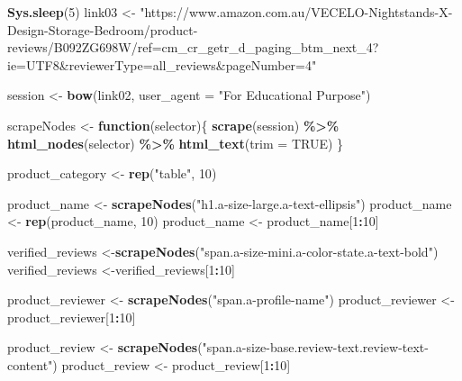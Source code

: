 \documentclass[
]{article}
\newenvironment{Shaded}{\begin{snugshade}}{\end{snugshade}}
\newcommand{\AttributeTok}[1]{\textcolor[rgb]{0.13,0.29,0.53}{#1}}
\newcommand{\ConstantTok}[1]{\textcolor[rgb]{0.56,0.35,0.01}{#1}}
\newcommand{\ControlFlowTok}[1]{\textcolor[rgb]{0.13,0.29,0.53}{\textbf{#1}}}
\newcommand{\DecValTok}[1]{\textcolor[rgb]{0.00,0.00,0.81}{#1}}
\newcommand{\FunctionTok}[1]{\textcolor[rgb]{0.13,0.29,0.53}{\textbf{#1}}}
\newcommand{\NormalTok}[1]{#1}
\newcommand{\OtherTok}[1]{\textcolor[rgb]{0.56,0.35,0.01}{#1}}
\newcommand{\SpecialCharTok}[1]{\textcolor[rgb]{0.81,0.36,0.00}{\textbf{#1}}}
\newcommand{\StringTok}[1]{\textcolor[rgb]{0.31,0.60,0.02}{#1}}
\begin{document}
\begin{Shaded}
\begin{Highlighting}[]
   \FunctionTok{Sys.sleep}\NormalTok{(}\DecValTok{5}\NormalTok{)}
\NormalTok{link03 }\OtherTok{\textless{}{-}} \StringTok{"https://www.amazon.com.au/VECELO{-}Nightstands{-}X{-}Design{-}Storage{-}Bedroom/product{-}reviews/B092ZG698W/ref=cm\_cr\_getr\_d\_paging\_btm\_next\_4?ie=UTF8\&reviewerType=all\_reviews\&pageNumber=4"}


\NormalTok{  session }\OtherTok{\textless{}{-}} \FunctionTok{bow}\NormalTok{(link02,}
               \AttributeTok{user\_agent =} \StringTok{"For Educational Purpose"}\NormalTok{)}

\NormalTok{  scrapeNodes }\OtherTok{\textless{}{-}} \ControlFlowTok{function}\NormalTok{(selector)\{}
    \FunctionTok{scrape}\NormalTok{(session) }\SpecialCharTok{\%\textgreater{}\%}
      \FunctionTok{html\_nodes}\NormalTok{(selector) }\SpecialCharTok{\%\textgreater{}\%}
      \FunctionTok{html\_text}\NormalTok{(}\AttributeTok{trim =} \ConstantTok{TRUE}\NormalTok{)}
\NormalTok{  \}}

\NormalTok{  product\_category }\OtherTok{\textless{}{-}} \FunctionTok{rep}\NormalTok{(}\StringTok{"table"}\NormalTok{, }\DecValTok{10}\NormalTok{)}

\NormalTok{  product\_name }\OtherTok{\textless{}{-}} \FunctionTok{scrapeNodes}\NormalTok{(}\StringTok{"h1.a{-}size{-}large.a{-}text{-}ellipsis"}\NormalTok{)}
\NormalTok{  product\_name }\OtherTok{\textless{}{-}} \FunctionTok{rep}\NormalTok{(product\_name, }\DecValTok{10}\NormalTok{)}
\NormalTok{  product\_name }\OtherTok{\textless{}{-}}\NormalTok{ product\_name[}\DecValTok{1}\SpecialCharTok{:}\DecValTok{10}\NormalTok{]}
  
\NormalTok{  verified\_reviews }\OtherTok{\textless{}{-}}\FunctionTok{scrapeNodes}\NormalTok{(}\StringTok{"span.a{-}size{-}mini.a{-}color{-}state.a{-}text{-}bold"}\NormalTok{)}
\NormalTok{  verified\_reviews }\OtherTok{\textless{}{-}}\NormalTok{verified\_reviews[}\DecValTok{1}\SpecialCharTok{:}\DecValTok{10}\NormalTok{]}
  
\NormalTok{  product\_reviewer }\OtherTok{\textless{}{-}} \FunctionTok{scrapeNodes}\NormalTok{(}\StringTok{"span.a{-}profile{-}name"}\NormalTok{)}
\NormalTok{  product\_reviewer }\OtherTok{\textless{}{-}}\NormalTok{ product\_reviewer[}\DecValTok{1}\SpecialCharTok{:}\DecValTok{10}\NormalTok{]}
  
\NormalTok{  product\_review }\OtherTok{\textless{}{-}} \FunctionTok{scrapeNodes}\NormalTok{(}\StringTok{"span.a{-}size{-}base.review{-}text.review{-}text{-}content"}\NormalTok{)}
\NormalTok{  product\_review }\OtherTok{\textless{}{-}}\NormalTok{ product\_review[}\DecValTok{1}\SpecialCharTok{:}\DecValTok{10}\NormalTok{]}
  

\end{Highlighting}
\end{Shaded}
\end{document}
